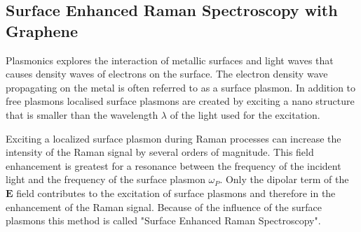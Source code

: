 \subsection{Surface Enhanced Raman Spectroscopy with Graphene}

Plasmonics explores the interaction of metallic surfaces and light waves that causes density waves of electrons on the surface. The electron density wave propagating on the metal is often referred to as a surface plasmon. In addition to free plasmons localised surface plasmons are created by exciting a nano structure that is smaller than the wavelength $\lambda$ of the light used for the excitation.

Exciting a localized surface plasmon during Raman processes can increase the intensity of the Raman signal by several orders of magnitude\mcite. This field enhancement is greatest for a resonance between the frequency of the incident light and the frequency of the surface plasmon $\omega_P$. Only the dipolar term of the $\mathbf{E}$ field contributes to the excitation of surface plasmons and therefore in the enhancement of the Raman signal. Because of the influence of the surface plasmons this method is called "Surface Enhanced Raman Spectroscopy".

